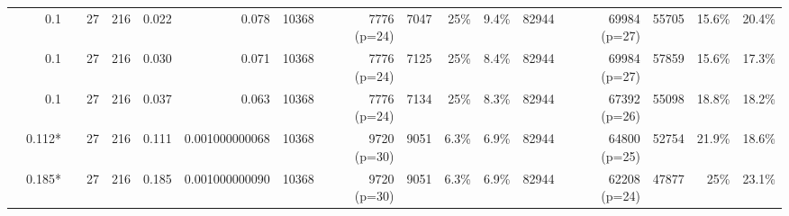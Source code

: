 \begin{landscape}
\begin{table}[p]
\begin{tabular}{|l|rrrrrrrrrrrrrrrr|}
		& 0.1 & \color{red}{0.0006} & 27 & 216 & 0.022 & 0.078 & 10368 & 7776 (p=24) & 7047 & 25\% & 9.4\% & 82944 & 69984 (p=27) & 55705 & 15.6\% & 20.4\% \\
		
		& 0.1 & \color{red}{0.0008} & 27 & 216 & 0.030 & 0.071 & 10368 & 7776 (p=24) & 7125 & 25\% & 8.4\% & 82944 & 69984 (p=27) & 57859 & 15.6\% & 17.3\% \\
		
		& 0.1 & \color{red}{0.0010} & 27 & 216 & 0.037 & 0.063 & 10368 & 7776 (p=24) & 7134 & 25\% & 8.3\% & 82944 & 67392 (p=26) & 55098 & 18.8\% & 18.2\% \\
		
		& 0.112* & \color{red}{0.0030} & 27 & 216 & 0.111 & 0.001000000068 & 10368 &  9720 (p=30) & 9051 & 6.3\% & 6.9\% & 82944 & 64800 (p=25) & 52754 & 21.9\% & 18.6\% \\
		
		& 0.185* &\color{red}{0.0050} & 27 & 216 & 0.185 & 0.001000000090 & 10368 & 9720 (p=30) & 9051 & 6.3\% & 6.9\% & 82944 & 62208 (p=24) & 47877 & 25\%& 23.1\% \\
		\cline{1-17}
	\end{tabular}
\end{table}
\end{landscape}

